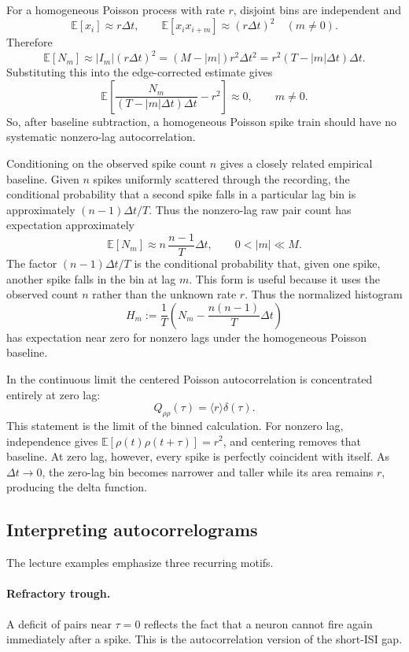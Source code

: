 \documentclass[11pt]{article}
\begin{document}
For a homogeneous Poisson process with rate $r$, disjoint bins are independent
and
\[
\mathbb{E}[x_i]\approx r\Delta t,
\qquad
\mathbb{E}[x_i x_{i+m}]
\approx
(r\Delta t)^2
\quad (m\ne 0).
\]
Therefore
\[
\mathbb{E}[N_m]
\approx
|I_m|(r\Delta t)^2
=
(M-|m|)r^2\Delta t^2
=
r^2(T-|m|\Delta t)\Delta t.
\]
Substituting this into the edge-corrected estimate gives
\[
\mathbb{E}\!\left[
\frac{N_m}{(T-|m|\Delta t)\Delta t}
-r^2
\right]
\approx 0,
\qquad m\ne 0.
\]
So, after baseline subtraction, a homogeneous Poisson spike train should have
no systematic nonzero-lag autocorrelation.

Conditioning on the observed spike count $n$ gives a closely related empirical
baseline. Given $n$ spikes uniformly scattered through the recording, the
conditional probability that a second spike falls in a particular lag bin is
approximately $(n-1)\Delta t/T$. Thus the nonzero-lag raw pair count has
expectation approximately
\[
\mathbb{E}[N_m]\approx n\,\frac{n-1}{T}\Delta t,
\qquad 0<|m|\ll M.
\]
The factor $(n-1)\Delta t/T$ is the conditional probability that, given one
spike, another spike falls in the bin at lag $m$. This form is useful because
it uses the observed count $n$ rather than the unknown rate $r$. Thus the
normalized histogram
\[
H_m:=
\frac{1}{T}
\left(
N_m-\frac{n(n-1)}{T}\Delta t
\right)
\]
has expectation near zero for nonzero lags under the homogeneous Poisson baseline.

In the continuous limit the centered Poisson autocorrelation is concentrated entirely at zero lag:
\[
Q_{\rho\rho}(\tau)=\langle r\rangle\delta(\tau).
\]
This statement is the limit of the binned calculation. For nonzero lag,
independence gives $\mathbb{E}[\rho(t)\rho(t+\tau)]=r^2$, and centering removes
that baseline. At zero lag, however, every spike is perfectly coincident with
itself. As $\Delta t\to 0$, the zero-lag bin becomes narrower and taller while
its area remains $r$, producing the delta function.

\subsection{Interpreting autocorrelograms}

The lecture examples emphasize three recurring motifs.

\paragraph{Refractory trough.}
A deficit of pairs near $\tau=0$ reflects the fact that a neuron cannot fire again immediately after a spike. This is the autocorrelation version of the short-ISI gap.
\end{document}
